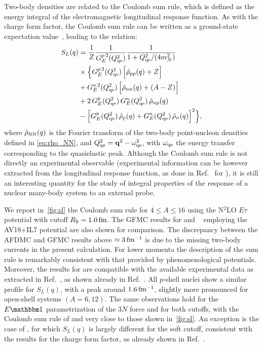 \documentclass[aps,prc,twocolumn,superscriptaddress,floatfix]{revtex4-1}
\begin{document}
Two-body densities are related to the Coulomb sum rule, which is defined as the energy integral 
of the electromagnetic longitudinal response function. As with the charge form factor, the Coulomb sum rule
can be written as a ground-state expectation value~\cite{Mcvoy:1962}, leading to the relation:
\begin{align}
	S_L(q)&=\frac{1}{Z} \frac{1}{G_E^{p\,2}(Q_{\rm qe}^2)}\frac{1}{1+Q_{\rm qe}^2/(4 m_N^2)} \nonumber \\
    & \times\Big\{ G_E^{p\,2}(Q_{\rm qe}^2)\,\Big[\tilde{\rho}_{pp}(q)+Z\Big] \nonumber \\
    &        +G_E^{n\,2}(Q_{\rm qe}^2)\,\Big[\tilde{\rho}_{nn}(q)+(A-Z)\Big] \nonumber \\
    &        +2\,G_E^p(Q_{\rm qe}^2)\,G_E^n(Q_{\rm qe}^2)\,\tilde{\rho}_{np}(q) \nonumber \\ 
    & -\Big[G_E^p(Q_{\rm qe}^2)\,\tilde{\rho}_p(q)+G_E^n(Q_{\rm qe}^2)\,\tilde{\rho}_n(q)\Big]^2 \Big\}, 
	\label{eq:sl}
\end{align}
where $\tilde{\rho}_{\rm{NN}}(q)$ is the Fourier transform of the two-body point-nucleon densities defined in \cref{eq:rho_NN},
and $Q^2_{\rm qe}=\vb{q}^2-\omega^2_{\rm qe}$, with $\omega_{\rm qe}$ the energy transfer 
corresponding to the quasielastic peak.
Although the Coulomb sum rule is not directly an experimental observable (experimental information can be however
extracted from the longitudinal response function, as done in Ref.~\cite{Lovato:2016} for ), it is
still an interesting quantity for the study of integral properties of the response of a nuclear many-body system to an
external probe.

We report in~\cref{fig:sl} the Coulomb sum rule for $4\le A\le16$ using the N$^2$LO $E\tau$ potential
with cutoff $R_0=1.0\,\rm fm$. The GFMC results for  
and ~\cite{Lovato:2013,Lonardoni:2017cvmc} employing the AV18+IL7 potential are also shown for comparison.
The discrepancy between the AFDMC and GFMC results above $\approx 3\,\rm fm^{-1}$ is due
to the missing two-body currents in the present calculation. For lower momenta the description of the sum rule 
is remarkably consistent with that provided by phenomenological potentials. 
Moreover, the results for  are 
compatible with the available experimental data as extracted in Ref.~\cite{Lovato:2016}, 
as shown already in Ref.~\cite{Lonardoni:2017afdmc}. 
All $p$-shell nuclei show a similar profile for $S_L(q)$, with a peak around 
$1.6\,\rm fm^{-1}$, slightly more pronounced for open-shell systems $(A=6,12)$.
The same observations hold for the $E\mathbbm1$ parametrization of the $3N$ force 
and for both cutoffs, with the Coulomb sum rule 
of  and  very close to those shown in~\cref{fig:sl}. 
An exception is the case of , for which $S_L(q)$
is largely different for the soft cutoff, consistent with the results for the charge form factor, 
as already shown in Ref.~\cite{Lonardoni:2017afdmc}.
\end{document}
